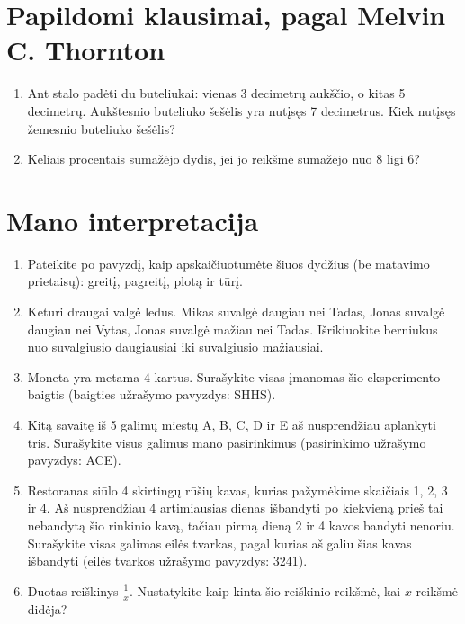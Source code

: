 \documentclass{article}
\begin{document}
\section*{Papildomi klausimai, pagal Melvin C. Thornton}

\begin{enumerate}
\setcounter{enumi}{\theenumTemp}
\item Ant stalo padėti du buteliukai: vienas 3 decimetrų aukščio, o kitas 5 decimetrų. Aukštesnio buteliuko šešėlis yra nutįsęs 7 decimetrus. Kiek nutįsęs žemesnio buteliuko šešėlis?
\item Keliais procentais sumažėjo dydis, jei jo reikšmė sumažėjo nuo 8 ligi 6?
\setcounter{enumTemp}{\theenumi}
\end{enumerate}

\section*{Mano interpretacija}

\begin{enumerate}
\setcounter{enumi}{\theenumTemp}
\item Pateikite po pavyzdį, kaip apskaičiuotumėte šiuos dydžius (be matavimo prietaisų): greitį, pagreitį, plotą ir tūrį.
\item Keturi draugai valgė ledus. Mikas suvalgė daugiau nei Tadas, Jonas suvalgė daugiau nei Vytas, Jonas suvalgė mažiau nei Tadas. Išrikiuokite berniukus nuo suvalgiusio daugiausiai iki suvalgiusio mažiausiai.
\item Moneta yra metama 4 kartus. Surašykite visas įmanomas šio eksperimento baigtis (baigties užrašymo pavyzdys: SHHS).
\item Kitą savaitę iš 5 galimų miestų A, B, C, D ir E aš nusprendžiau aplankyti tris. Surašykite visus galimus mano pasirinkimus (pasirinkimo užrašymo pavyzdys: ACE).
\item Restoranas siūlo 4 skirtingų rūšių kavas, kurias pažymėkime skaičiais 1, 2, 3 ir 4. Aš nusprendžiau 4 artimiausias dienas išbandyti po kiekvieną prieš tai nebandytą šio rinkinio kavą, tačiau pirmą dieną 2 ir 4 kavos bandyti nenoriu. Surašykite visas galimas eilės tvarkas, pagal kurias aš galiu šias kavas išbandyti (eilės tvarkos užrašymo pavyzdys: 3241).
\item Duotas reiškinys $\frac{1}{x}$. Nustatykite kaip kinta šio reiškinio reikšmė, kai $x$ reikšmė didėja?
\setcounter{enumTemp}{\theenumi}
\end{enumerate}
\end{document}
